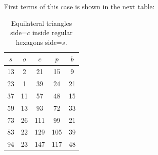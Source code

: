 \documentclass[11pt]{article}
\begin{document}
First terms of this case is shown in the next table:
\begin{table}[H]
\begin{center}
\begin{tabular}{||c c c c c||} 
 \hline
 $s$ & $o$ & $c$ & $p$ & $b$ \\ [0.5ex] 
 \hline\hline
  13 &  2 &  21 &  15 &  9 \\ \hline
  23 &  1 &  39 &  24 & 21 \\ \hline
  37 & 11 &  57 &  48 & 15 \\ \hline
  59 & 13 &  93 &  72 & 33 \\ \hline
  73 & 26 & 111 &  99 & 21 \\ \hline
  83 & 22 & 129 & 105 & 39 \\ \hline
  94 & 23 & 147 & 117 & 48 \\ \hline
\end{tabular}
\caption{Equilateral triangles side=$c$ inside regular hexagons side=$s$.}
\label{tbl:eqtriangles}
\end{center}
\end{table}
\end{document}
